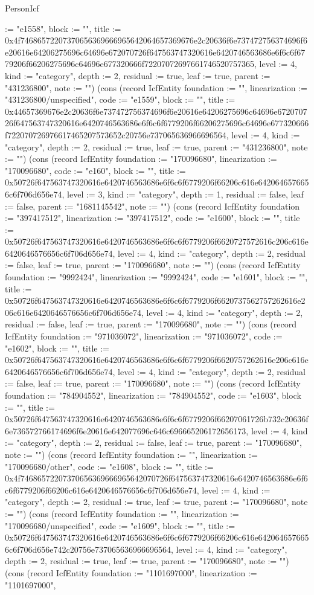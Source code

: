 \begin{lexlean}{PersonIcf}
\begin{semanticmodule}
{:= "e1558", block := "", title := 0x4f74686572207370656369666965642064657369676e2c20636f6e737472756374696f6e20616e64206275696c64696e672070726f647563747320616e6420746563686e6f6c6f6779206f66206275696c64696e677320666f72207072697661746520757365, level := 4, kind := "category", depth := 2, residual := true, leaf := true, parent := "431236800", note := ""}) (cons (record IcfEntity {foundation := "", linearization := "431236800/unspecified", code := "e1559", block := "", title := 0x44657369676e2c20636f6e737472756374696f6e20616e64206275696c64696e672070726f647563747320616e6420746563686e6f6c6f6779206f66206275696c64696e677320666f722070726976617465207573652c20756e737065636966696564, level := 4, kind := "category", depth := 2, residual := true, leaf := true, parent := "431236800", note := ""}) (cons (record IcfEntity {foundation := "170096680", linearization := "170096680", code := "e160", block := "", title := 0x50726f647563747320616e6420746563686e6f6c6f6779206f66206c616e6420646576656c6f706d656e74, level := 3, kind := "category", depth := 1, residual := false, leaf := false, parent := "1681145542", note := ""}) (cons (record IcfEntity {foundation := "397417512", linearization := "397417512", code := "e1600", block := "", title := 0x50726f647563747320616e6420746563686e6f6c6f6779206f6620727572616c206c616e6420646576656c6f706d656e74, level := 4, kind := "category", depth := 2, residual := false, leaf := true, parent := "170096680", note := ""}) (cons (record IcfEntity {foundation := "9992424", linearization := "9992424", code := "e1601", block := "", title := 0x50726f647563747320616e6420746563686e6f6c6f6779206f6620737562757262616e206c616e6420646576656c6f706d656e74, level := 4, kind := "category", depth := 2, residual := false, leaf := true, parent := "170096680", note := ""}) (cons (record IcfEntity {foundation := "971036072", linearization := "971036072", code := "e1602", block := "", title := 0x50726f647563747320616e6420746563686e6f6c6f6779206f6620757262616e206c616e6420646576656c6f706d656e74, level := 4, kind := "category", depth := 2, residual := false, leaf := true, parent := "170096680", note := ""}) (cons (record IcfEntity {foundation := "784904552", linearization := "784904552", code := "e1603", block := "", title := 0x50726f647563747320616e6420746563686e6f6c6f6779206f66207061726b732c20636f6e736572766174696f6e20616e642077696c646c696665206172656173, level := 4, kind := "category", depth := 2, residual := false, leaf := true, parent := "170096680", note := ""}) (cons (record IcfEntity {foundation := "", linearization := "170096680/other", code := "e1608", block := "", title := 0x4f74686572207370656369666965642070726f647563747320616e6420746563686e6f6c6f6779206f66206c616e6420646576656c6f706d656e74, level := 4, kind := "category", depth := 2, residual := true, leaf := true, parent := "170096680", note := ""}) (cons (record IcfEntity {foundation := "", linearization := "170096680/unspecified", code := "e1609", block := "", title := 0x50726f647563747320616e6420746563686e6f6c6f6779206f66206c616e6420646576656c6f706d656e742c20756e737065636966696564, level := 4, kind := "category", depth := 2, residual := true, leaf := true, parent := "170096680", note := ""}) (cons (record IcfEntity {foundation := "1101697000", linearization := "1101697000", }
\end{semanticmodule}
\end{lexlean}
